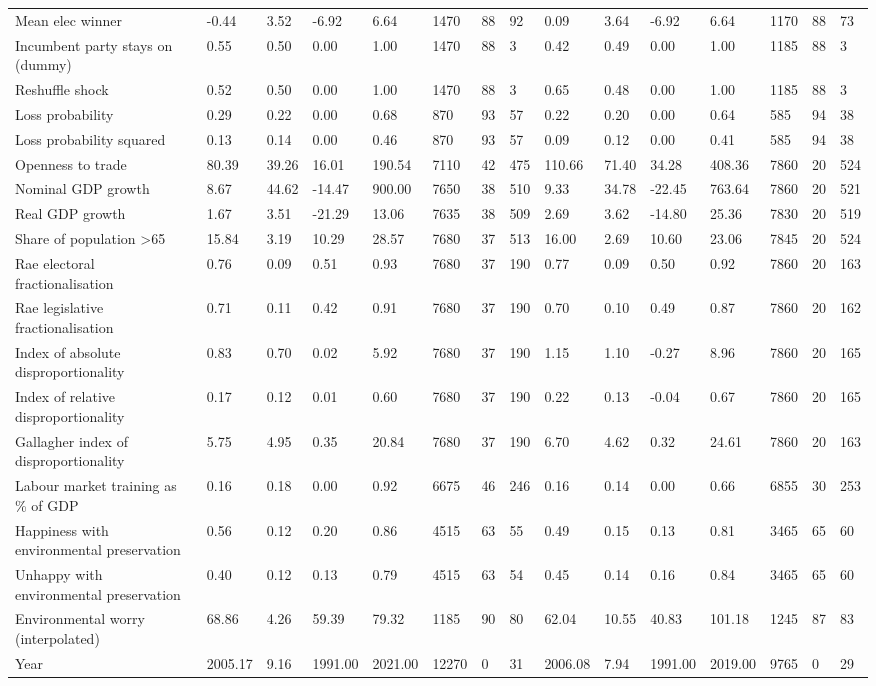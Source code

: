 \begin{longtable}{lllllllllllllll}
Mean elec winner & -0.44 & 3.52 & -6.92 & 6.64 & 1470 & 88 & 92 & 0.09 & 3.64 & -6.92 & 6.64 & 1170 & 88 & 73\\
Incumbent party stays on (dummy) & 0.55 & 0.50 & 0.00 & 1.00 & 1470 & 88 & 3 & 0.42 & 0.49 & 0.00 & 1.00 & 1185 & 88 & 3\\
\addlinespace
Reshuffle shock & 0.52 & 0.50 & 0.00 & 1.00 & 1470 & 88 & 3 & 0.65 & 0.48 & 0.00 & 1.00 & 1185 & 88 & 3\\
Loss probability & 0.29 & 0.22 & 0.00 & 0.68 & 870 & 93 & 57 & 0.22 & 0.20 & 0.00 & 0.64 & 585 & 94 & 38\\
Loss probability squared & 0.13 & 0.14 & 0.00 & 0.46 & 870 & 93 & 57 & 0.09 & 0.12 & 0.00 & 0.41 & 585 & 94 & 38\\
Openness to trade & 80.39 & 39.26 & 16.01 & 190.54 & 7110 & 42 & 475 & 110.66 & 71.40 & 34.28 & 408.36 & 7860 & 20 & 524\\
Nominal GDP growth & 8.67 & 44.62 & -14.47 & 900.00 & 7650 & 38 & 510 & 9.33 & 34.78 & -22.45 & 763.64 & 7860 & 20 & 521\\
\addlinespace
Real GDP growth & 1.67 & 3.51 & -21.29 & 13.06 & 7635 & 38 & 509 & 2.69 & 3.62 & -14.80 & 25.36 & 7830 & 20 & 519\\
Share of population >65 & 15.84 & 3.19 & 10.29 & 28.57 & 7680 & 37 & 513 & 16.00 & 2.69 & 10.60 & 23.06 & 7845 & 20 & 524\\
Rae electoral fractionalisation & 0.76 & 0.09 & 0.51 & 0.93 & 7680 & 37 & 190 & 0.77 & 0.09 & 0.50 & 0.92 & 7860 & 20 & 163\\
Rae legislative fractionalisation & 0.71 & 0.11 & 0.42 & 0.91 & 7680 & 37 & 190 & 0.70 & 0.10 & 0.49 & 0.87 & 7860 & 20 & 162\\
Index of absolute disproportionality & 0.83 & 0.70 & 0.02 & 5.92 & 7680 & 37 & 190 & 1.15 & 1.10 & -0.27 & 8.96 & 7860 & 20 & 165\\
\addlinespace
Index of relative disproportionality & 0.17 & 0.12 & 0.01 & 0.60 & 7680 & 37 & 190 & 0.22 & 0.13 & -0.04 & 0.67 & 7860 & 20 & 165\\
Gallagher index of disproportionality & 5.75 & 4.95 & 0.35 & 20.84 & 7680 & 37 & 190 & 6.70 & 4.62 & 0.32 & 24.61 & 7860 & 20 & 163\\
Labour market training as \% of GDP & 0.16 & 0.18 & 0.00 & 0.92 & 6675 & 46 & 246 & 0.16 & 0.14 & 0.00 & 0.66 & 6855 & 30 & 253\\
Happiness with environmental preservation & 0.56 & 0.12 & 0.20 & 0.86 & 4515 & 63 & 55 & 0.49 & 0.15 & 0.13 & 0.81 & 3465 & 65 & 60\\
Unhappy with environmental preservation & 0.40 & 0.12 & 0.13 & 0.79 & 4515 & 63 & 54 & 0.45 & 0.14 & 0.16 & 0.84 & 3465 & 65 & 60\\
\addlinespace
Environmental worry (interpolated) & 68.86 & 4.26 & 59.39 & 79.32 & 1185 & 90 & 80 & 62.04 & 10.55 & 40.83 & 101.18 & 1245 & 87 & 83\\
Year & 2005.17 & 9.16 & 1991.00 & 2021.00 & 12270 & 0 & 31 & 2006.08 & 7.94 & 1991.00 & 2019.00 & 9765 & 0 & 29\\
\bottomrule
\end{longtable}
